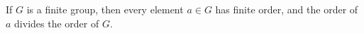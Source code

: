 If $G$ is a finite group, then every element $a \in G$ has finite order, and the order of $a$ divides the order of $G$.
